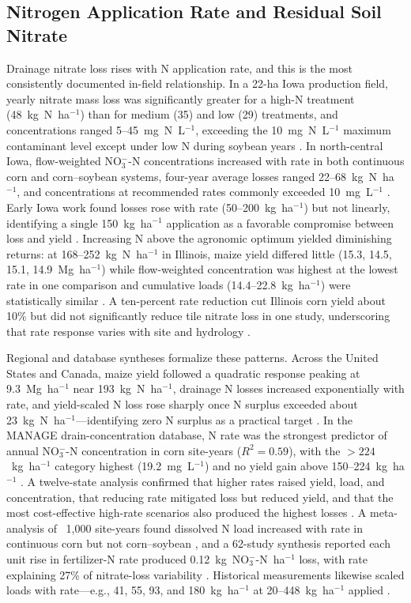 \documentclass[11pt]{article}
\begin{document}
\subsection{Nitrogen Application Rate and Residual Soil Nitrate}

Drainage nitrate loss rises with N application rate, and this is the most consistently documented in-field relationship. In a 22-ha Iowa production field, yearly nitrate mass loss was significantly greater for a high-N treatment (48~kg~N~ha$^{-1}$) than for medium (35) and low (29) treatments, and concentrations ranged 5--45~mg~N~L$^{-1}$, exceeding the 10~mg~N~L$^{-1}$ maximum contaminant level except under low N during soybean years \parencite{Jaynes2001}. In north-central Iowa, flow-weighted NO$_3^-$-N concentrations increased with rate in both continuous corn and corn--soybean systems, four-year average losses ranged 22--68~kg~N~ha$^{-1}$, and concentrations at recommended rates commonly exceeded 10~mg~L$^{-1}$ \parencite{Helmers2012b}. Early Iowa work found losses rose with rate (50--200~kg~ha$^{-1}$) but not linearly, identifying a single 150~kg~ha$^{-1}$ application as a favorable compromise between loss and yield \parencite{Azevedo1997}. Increasing N above the agronomic optimum yielded diminishing returns: at 168--252~kg~N~ha$^{-1}$ in Illinois, maize yield differed little (15.3, 14.5, 15.1, 14.9~Mg~ha$^{-1}$) while flow-weighted concentration was highest at the lowest rate in one comparison and cumulative loads (14.4--22.8~kg~ha$^{-1}$) were statistically similar \parencite{Li2023b}. A ten-percent rate reduction cut Illinois corn yield about 10\% but did not significantly reduce tile nitrate loss in one study, underscoring that rate response varies with site and hydrology \parencite{Gentry2024}.

Regional and database syntheses formalize these patterns. Across the United States and Canada, maize yield followed a quadratic response peaking at 9.3~Mg~ha$^{-1}$ near 193~kg~N~ha$^{-1}$, drainage N losses increased exponentially with rate, and yield-scaled N loss rose sharply once N surplus exceeded about 23~kg~N~ha$^{-1}$---identifying zero N surplus as a practical target \parencite{Zhao2016}. In the MANAGE drain-concentration database, N rate was the strongest predictor of annual NO$_3^-$-N concentration in corn site-years ($R^2=0.59$), with the $>224$~kg~ha$^{-1}$ category highest (19.2~mg~L$^{-1}$) and no yield gain above 150--224~kg~ha$^{-1}$ \parencite{Hertzberger2019}. A twelve-state analysis confirmed that higher rates raised yield, load, and concentration, that reducing rate mitigated loss but reduced yield, and that the most cost-effective high-rate scenarios also produced the highest losses \parencite{Liu2021}. A meta-analysis of ~1,000 site-years found dissolved N load increased with rate in continuous corn but not corn--soybean \parencite{Christianson2015b}, and a 62-study synthesis reported each unit rise in fertilizer-N rate produced 0.12~kg~NO$_3^-$-N~ha$^{-1}$ loss, with rate explaining 27\% of nitrate-loss variability \parencite{Chatterjee2020b}. Historical measurements likewise scaled loads with rate---e.g., 41, 55, 93, and 180~kg~ha$^{-1}$ at 20--448~kg~ha$^{-1}$ applied \parencite{Ritter2015}.
\end{document}
